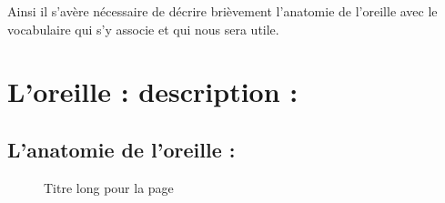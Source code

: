 \documentclass[12pt,french]{report}
\begin{document}
Ainsi il s'avère nécessaire de décrire brièvement l'anatomie de l'oreille
avec le vocabulaire qui s'y associe et qui nous sera utile.

\section{L'oreille : description : }

\subsection{L'anatomie de l'oreille :}
\begin{figure}
	\centering
	\caption[Titre pour toc]{Titre long pour la page}
	\label{fig:-20160624berufsfeldgruppen}
\end{figure}


%
\end{document}
